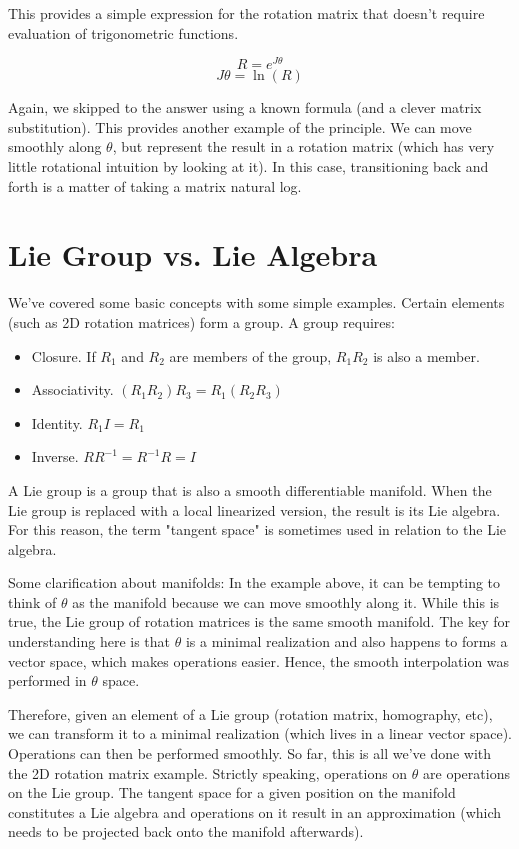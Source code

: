 \documentclass{article}
\begin{document}
  This provides a simple expression for the rotation matrix that doesn't require evaluation of trigonometric functions.

  \begin{equation}
    R = e^{J\theta}
  \end{equation}
  \begin{equation}
    J\theta = \ln(R)
  \end{equation}

  Again, we skipped to the answer using a known formula (and a clever matrix substitution). This provides another example of the principle. We can move smoothly along $\theta$, but represent the result in a rotation matrix (which has very little rotational intuition by looking at it). In this case, transitioning back and forth is a matter of taking a matrix natural log.

\section{Lie Group vs. Lie Algebra}
  We've covered some basic concepts with some simple examples. Certain elements (such as 2D rotation matrices) form a group. A group requires:
  \begin{itemize}
    \item Closure. If $R_1$ and $R_2$ are members of the group, $R_1R_2$ is also a member.
    \item Associativity. $(R_1R_2)R_3 = R_1(R_2R_3)$
    \item Identity. $R_1I = R_1$
    \item Inverse. $RR^{-1}=R^{-1}R=I$
  \end{itemize}
  A Lie group is a group that is also a smooth differentiable manifold. When the Lie group is replaced with a local linearized version, the result is its Lie algebra. For this reason, the term "tangent space" is sometimes used in relation to the Lie algebra.

  Some clarification about manifolds: In the example above, it can be tempting to think of $\theta$ as the manifold because we can move smoothly along it. While this is true, the Lie group of rotation matrices is the same smooth manifold. The key for understanding here is that $\theta$ is a minimal realization and also happens to forms a vector space, which makes operations easier. Hence, the smooth interpolation was performed in $\theta$ space.

  Therefore, given an element of a Lie group (rotation matrix, homography, etc), we can transform it to a minimal realization (which lives in a linear vector space). Operations can then be performed smoothly. So far, this is all we've done with the 2D rotation matrix example. Strictly speaking, operations on $\theta$ are operations on the Lie group. The tangent space for a given position on the manifold constitutes a Lie algebra and operations on it result in an approximation (which needs to be projected back onto the manifold afterwards).
\end{document}

